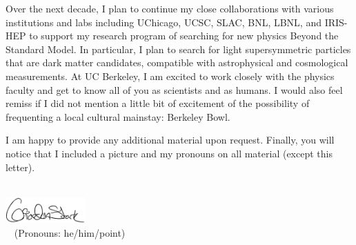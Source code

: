 \documentclass[10pt,letterpaper,sans]{moderncv/moderncv} %
\makeatletter
\renewcommand*{\makeletterclosing}{
  \@closing\\[0.5em]%
  \includegraphics[height=1cm]{pictures/signature}\\%
  {\bfseries \@firstname~\@lastname} (Pronouns: he/him/point)%
  \ifthenelse{\isundefined{\@enclosure}}{}{%
    \\%
    \vfill%
    {\color{color2}\itshape\enclname: \@enclosure}}}
\makeatother
\begin{document}
Over the next decade, I plan to continue my close collaborations with various institutions and labs including UChicago, UCSC, SLAC, BNL, LBNL, and IRIS-HEP to support my research program of searching for new physics Beyond the Standard Model. In particular, I plan to search for light supersymmetric particles that are dark matter candidates, compatible with astrophysical and cosmological measurements. At UC Berkeley, I am excited to work closely with the physics faculty and get to know all of you as scientists and as humans. I would also feel remiss if I did not mention a little bit of excitement of the possibility of frequenting a local cultural mainstay: Berkeley Bowl.

I am happy to provide any additional material upon request. Finally, you will notice that I included a picture and my pronouns on all material (except this letter).

\makeletterclosing
\end{document}
